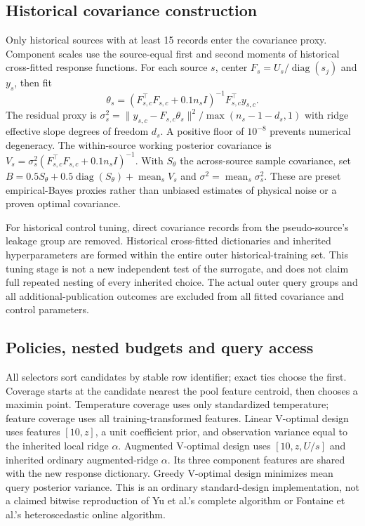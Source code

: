 \documentclass[11pt]{article}
\begin{document}
\subsection{Historical covariance construction}
Only historical sources with at least 15 records enter the covariance proxy. Component scales use the source-equal first and second moments of historical cross-fitted response functions. For each source $s$, center $F_s=U_s/\operatorname{diag}(s_j)$ and $y_s$, then fit
\[
\theta_s=(F_{s,c}^\top F_{s,c}+0.1n_sI)^{-1}F_{s,c}^\top y_{s,c}.
\]
The residual proxy is $\sigma_s^2=\|y_{s,c}-F_{s,c}\theta_s\|^2/\max(n_s-1-d_s,1)$ with ridge effective slope degrees of freedom $d_s$. A positive floor of $10^{-8}$ prevents numerical degeneracy. The within-source working posterior covariance is $V_s=\sigma_s^2(F_{s,c}^\top F_{s,c}+0.1n_sI)^{-1}$. With $S_\theta$ the across-source sample covariance, set $B=0.5S_\theta+0.5\operatorname{diag}(S_\theta)+\operatorname{mean}_sV_s$ and $\sigma^2=\operatorname{mean}_s\sigma_s^2$. These are preset empirical-Bayes proxies rather than unbiased estimates of physical noise or a proven optimal covariance.

For historical control tuning, direct covariance records from the pseudo-source's leakage group are removed. Historical cross-fitted dictionaries and inherited hyperparameters are formed within the entire outer historical-training set. This tuning stage is not a new independent test of the surrogate, and does not claim full repeated nesting of every inherited choice. The actual outer query groups and all additional-publication outcomes are excluded from all fitted covariance and control parameters.

\subsection{Policies, nested budgets and query access}
All selectors sort candidates by stable row identifier; exact ties choose the first. Coverage starts at the candidate nearest the pool feature centroid, then chooses a maximin point. Temperature coverage uses only standardized temperature; feature coverage uses all training-transformed features. Linear V-optimal design uses features $[10,z]$, a unit coefficient prior, and observation variance equal to the inherited local ridge $\alpha$. Augmented V-optimal design uses $[10,z,U/s]$ and inherited ordinary augmented-ridge $\alpha$. Its three component features are shared with the new response dictionary. Greedy V-optimal design minimizes mean query posterior variance. This is an ordinary standard-design implementation, not a claimed bitwise reproduction of Yu et al.'s complete algorithm or Fontaine et al.'s heteroscedastic online algorithm.
\end{document}
